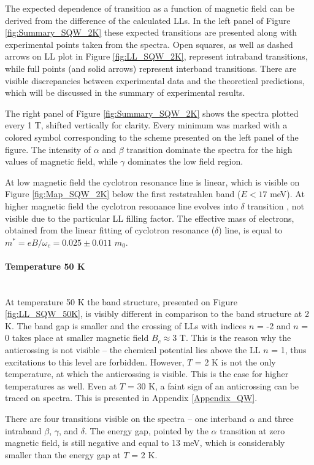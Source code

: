 \documentclass[titlepage,a4paper]{book}
\newcommand{\wciecie}{\quad\phantom{v}}
\newcommand{\myparagraph}[1]{\paragraph{#1}\mbox{}\\}
\begin{document}
The expected dependence of transition as a function of magnetic field can be derived from the difference of the calculated LLs. In the left panel of Figure \ref{fig:Summary_SQW_2K} these expected transitions are presented along with experimental points taken from the spectra. Open squares, as well as dashed arrows on LL plot in Figure \ref{fig:LL_SQW_2K}, represent intraband transitions, while full points (and solid arrows) represent interband transitions. There are visible discrepancies between experimental data and the theoretical predictions, which will be discussed in the summary of experimental results.

The right panel of Figure \ref{fig:Summary_SQW_2K} shows the spectra plotted every 1 T, shifted vertically for clarity. Every minimum was marked with a colored symbol corresponding to the scheme presented on the left panel of the figure. The intensity of $\alpha$ and $\beta$ transition dominate the spectra for the high values of magnetic field, while $\gamma$ dominates the low field region.

At low magnetic field the cyclotron resonance line is linear, which is visible on Figure \ref{fig:Map_SQW_2K} below the first reststrahlen band ($E < 17$ meV). At higher magnetic field the cyclotron resonance line evolves into $\delta$ transition \cite{Orlita_MCT_QW}, not visible due to the particular LL filling factor. The effective mass of electrons, obtained from the linear fitting of cyclotron resonance ($\delta$) line, is equal to $m^* = eB/\omega_c = 0.025 \pm 0.011$ $m_0$.

\clearpage
\myparagraph{Temperature 50 K}
\wciecie
At temperature 50 K the band structure, presented on Figure \ref{fig:LL_SQW_50K}, is visibly different in comparison to the band structure at 2 K. The band gap is smaller and the crossing of LLs with indices $n$ = -2 and $n$ = 0 takes place at smaller magnetic field $B_c \approx 3$ T. This is the reason why the anticrossing is not visible -- the chemical potential lies above the LL $n$ = 1, thus excitations to this level are forbidden. However, $T$ = 2 K is not the only temperature, at which the anticrossing is visible. This is the case for higher temperatures as well. Even at $T$ = 30 K, a faint sign of an anticrossing can be traced on spectra. This is presented in Appendix \ref{Appendix_QW}.

There are four transitions visible on the spectra -- one interband $\alpha$ and three intraband $\beta$, $\gamma$, and $\delta$. The energy gap, pointed by the $\alpha$ transition at zero magnetic field, is still negative and equal to 13 meV, which is considerably smaller than the energy gap at $T$ = 2 K.
\end{document}

